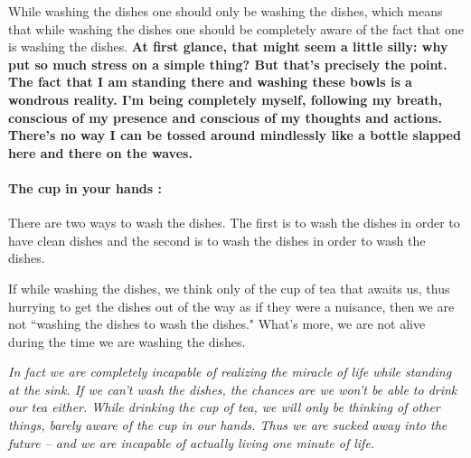 \documentclass[a4paper,12pt]{article}
\begin{document}
While washing the dishes one should only be washing the dishes, which means that 
while washing the dishes one should be completely aware of the fact that one is 
washing the dishes. \textbf{At first glance, that might seem a little silly: why put so 
much stress on a simple thing? But that’s precisely the point. The fact that I 
am standing there and washing these bowls is a wondrous 
reality. I'm being completely myself, following my breath, conscious of my 
presence and conscious of my thoughts and actions. There's no way I can be 
tossed around mindlessly like a bottle slapped here and there on the waves.}


\paragraph{The cup in your hands :} There are two ways to wash the dishes. 
The first is to wash the dishes in order to have clean dishes and the second is 
to wash the dishes in order to wash the dishes. 

If while washing the dishes, we think only of the cup of tea that awaits us, 
thus hurrying to get the dishes out of the way as if they were a nuisance, then 
we are not ``washing the dishes to wash the dishes." What's more, we are not 
alive during the time we are washing the dishes.

\textit{In fact we are completely incapable of realizing the miracle of life while 
standing at the sink. If we can't wash the dishes, the chances are we won't be 
able to drink our tea either. While drinking the cup of tea, we will only be 
thinking of other things, barely aware of the cup in our hands. Thus we are 
sucked away into the future \--- and we are incapable of actually living one 
minute of life.}
\end{document}
